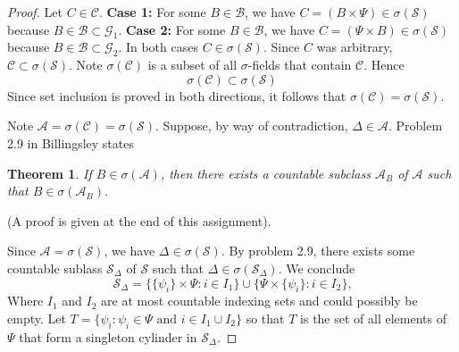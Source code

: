 \documentclass[letterpaper, 12pt]{article}
\newtheorem*{nthm}{Theorem}
\newcommand{\cA}{\mathcal{A}}
\newcommand{\sA}{\mathscr{A}}
\newcommand{\cB}{\mathcal{B}}
\newcommand{\cC}{\mathcal{C}}
\newcommand{\cG}{\mathcal{G}}
\newcommand{\cS}{\mathcal{S}}
\begin{document}
\begin{enumerate}
\begin{proof}
Let $C \in \cC$. \textbf{Case 1:} For some $B \in \cB$, we have $C = (B \times \Psi) \in \sigma(\cS)$ because $B \in \cB \subset \cG_1$. \textbf{Case 2:} For some $B \in \cB$, we have $C = (\Psi \times B) \in \sigma(\cS)$ because $B \in \cB \subset \cG_2$. In both cases $C \in \sigma(\cS)$. Since $C$ was arbitrary, $\cC \subset \sigma(\cS)$. Note $\sigma(\cC)$ is a subset of all $\sigma$-fields that contain $\cC$. Hence 
\[
\sigma(\cC) \subset \sigma(\cS)
\]
Since set inclusion is proved in both directions, it follows that $\sigma(\cC) = \sigma(\cS)$. 

Note $\cA = \sigma(\cC) = \sigma(\cS)$.
Suppose, by way of contradiction, $\Delta \in \cA$.
Problem 2.9 in Billingsley states
\begin{nthm}
If $B \in \sigma(\sA)$, then there exists a countable subclass $\sA_B$ of $\sA$ such that $B \in \sigma(\sA_B)$.
\end{nthm}
(A proof is given at the end of this assignment).

Since $\cA = \sigma(\cS)$, we have $\Delta \in \sigma(\cS)$. 
By problem 2.9, there exists some countable sublass $\cS_\Delta$ of $\cS$ such that $\Delta \in \sigma(\cS_\Delta)$. 
We conclude
\[
\cS_\Delta = \{ \{\psi_i\} \times \Psi : i \in I_1\} \cup \{ \Psi \times \{ \psi_i \} : i \in I_2 \}
\text{,}
\]
Where $I_1$ and $I_2$ are at most countable indexing sets and could possibly be empty. 
Let $T = \{\psi_i : \psi_i \in \Psi \text{ and }i \in I_1 \cup I_2\}$ so that $T$ is the set of all elements of $\Psi$ that form a singleton cylinder in $\cS_\Delta$.


\end{proof}
\end{enumerate}
\end{document}
